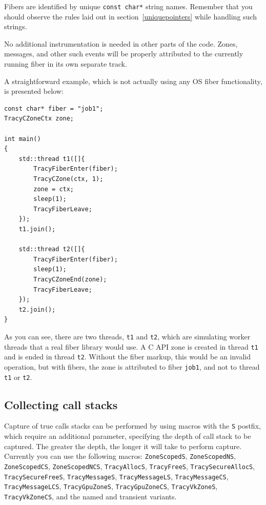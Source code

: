 \documentclass[hidelinks,titlepage,a4paper]{article}
\begin{document}
Fibers are identified by unique \texttt{const char*} string names. Remember that you should observe the rules laid out in section~\ref{uniquepointers} while handling such strings.

No additional instrumentation is needed in other parts of the code. Zones, messages, and other such events will be properly attributed to the currently running fiber in its own separate track.

A straightforward example, which is not actually using any OS fiber functionality, is presented below:

\begin{lstlisting}
const char* fiber = "job1";
TracyCZoneCtx zone;

int main()
{
    std::thread t1([]{
        TracyFiberEnter(fiber);
        TracyCZone(ctx, 1);
        zone = ctx;
        sleep(1);
        TracyFiberLeave;
    });
    t1.join();

    std::thread t2([]{
        TracyFiberEnter(fiber);
        sleep(1);
        TracyCZoneEnd(zone);
        TracyFiberLeave;
    });
    t2.join();
}
\end{lstlisting}

As you can see, there are two threads, \texttt{t1} and \texttt{t2}, which are simulating worker threads that a real fiber library would use. A C API zone is created in thread \texttt{t1} and is ended in thread \texttt{t2}. Without the fiber markup, this would be an invalid operation, but with fibers, the zone is attributed to fiber \texttt{job1}, and not to thread \texttt{t1} or \texttt{t2}.

\subsection{Collecting call stacks}
\label{collectingcallstacks}

Capture of true calls stacks can be performed by using macros with the \texttt{S} postfix, which require an additional parameter, specifying the depth of call stack to be captured. The greater the depth, the longer it will take to perform capture. Currently you can use the following macros: \texttt{ZoneScopedS}, \texttt{ZoneScopedNS}, \texttt{ZoneScopedCS}, \texttt{ZoneScopedNCS}, \texttt{TracyAllocS}, \texttt{TracyFreeS}, \texttt{TracySecureAllocS}, \texttt{TracySecureFreeS}, \texttt{TracyMessageS}, \texttt{TracyMessageLS}, \texttt{TracyMessageCS}, \texttt{TracyMessageLCS}, \texttt{TracyGpuZoneS}, \texttt{TracyGpuZoneCS}, \texttt{TracyVkZoneS}, \texttt{TracyVkZoneCS}, and the named and transient variants.
\end{document}
